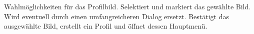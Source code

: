 \begin{center}
\setlength\fboxsep{20pt}
\setlength\fboxrule{1pt}
\end{center}

\begin{requirements}
 Wahlmöglichkeiten für das Profilbild. Selektiert und markiert das gewählte Bild. Wird eventuell durch einen umfangreicheren Dialog ersetzt.
 Bestätigt das ausgewählte Bild, erstellt ein Profil und öffnet dessen Hauptmenü.
\end{requirements}

